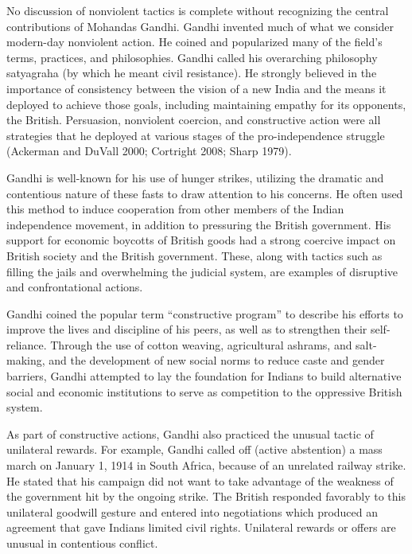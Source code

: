 \documentclass[twoside,a4paper,12pt,fleqn,openany]{extbook}
\begin{document}
No discussion of nonviolent tactics is complete without recognizing the central contributions of Mohandas Gandhi. Gandhi invented much of what we consider modern-day nonviolent action. He coined and popularized many of the field’s terms, practices, and philosophies. Gandhi called his overarching philosophy satyagraha (by which he meant civil resistance). He strongly believed in the importance of consistency between the vision of a new India and the means it deployed to achieve those goals, including maintaining empathy for its opponents, the British. Persuasion, nonviolent coercion, and constructive action were all strategies that he deployed at various stages of the pro-independence struggle (Ackerman and DuVall 2000; Cortright 2008; Sharp 1979).

Gandhi is well-known for his use of hunger strikes, utilizing the dramatic and contentious nature of these fasts to draw attention to his concerns. He often used this method to induce cooperation from other members of the Indian independence movement, in addition to pressuring the British government. His support for economic boycotts of British goods had a strong coercive impact on British society and the British government. These, along with tactics such as filling the jails and overwhelming the judicial system, are examples of disruptive and confrontational actions.

Gandhi coined the popular term “constructive program” to describe his efforts to improve the lives and discipline of his peers, as well as to strengthen their self-reliance. Through the use of cotton weaving, agricultural ashrams, and salt-making, and the development of new social norms to reduce caste and gender barriers, Gandhi attempted to lay the foundation for Indians to build alternative social and economic institutions to serve as competition to the oppressive British system.

As part of constructive actions, Gandhi also practiced the unusual tactic of unilateral rewards. For example, Gandhi called off (active abstention) a mass march on January 1, 1914 in South Africa, because of an unrelated railway strike. He stated that his campaign did not want to take advantage of the weakness of the government hit by the ongoing strike. The British responded favorably to this unilateral goodwill gesture and entered into negotiations which produced an agreement that gave Indians limited civil rights. Unilateral rewards or offers are unusual in contentious conflict.
\end{document}
